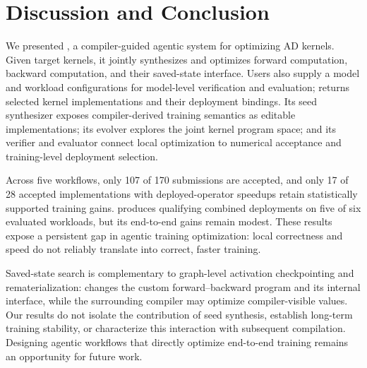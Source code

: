\section{Discussion and Conclusion}
We presented \method, a compiler-guided agentic system for optimizing AD kernels. Given target kernels, it jointly synthesizes and optimizes forward computation, backward computation, and their saved-state interface. Users also supply a model and workload configurations for model-level verification and evaluation; \method returns selected kernel implementations and their deployment bindings. Its seed synthesizer exposes compiler-derived training semantics as editable implementations; its evolver explores the joint kernel program space; and its verifier and evaluator connect local optimization to numerical acceptance and training-level deployment selection.

Across five workflows, only 107 of 170 submissions are accepted, and only 17 of 28 accepted implementations with deployed-operator speedups retain statistically supported training gains. \method produces qualifying combined deployments on five of six evaluated workloads, but its end-to-end gains remain modest. These results expose a persistent gap in agentic training optimization: local correctness and speed do not reliably translate into correct, faster training.

Saved-state search is complementary to graph-level activation checkpointing and rematerialization: \method changes the custom forward--backward program and its internal interface, while the surrounding compiler may optimize compiler-visible values. Our results do not isolate the contribution of seed synthesis, establish long-term training stability, or characterize this interaction with subsequent compilation. Designing agentic workflows that directly optimize end-to-end training remains an opportunity for future work.


